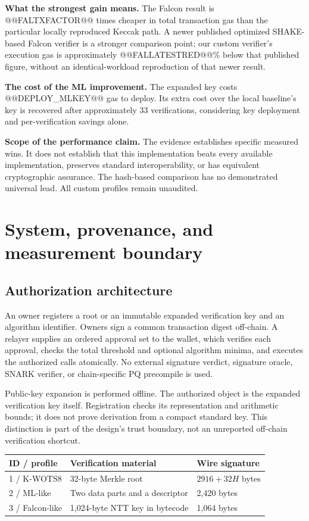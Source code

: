 \documentclass[11pt,a4paper]{article}
\newcommand{\callout}[1]{\par\smallskip\noindent\colorbox{pale}{\parbox{\dimexpr\linewidth-2\fboxsep\relax}{\small #1}}\par\smallskip}
\begin{document}
\textbf{What the strongest gain means.} The Falcon result is
@@FALTXFACTOR@@ times cheaper in total transaction gas than the particular
locally reproduced Keccak path. A newer published optimized SHAKE-based Falcon
verifier is a stronger comparison point; our custom verifier's execution gas
is approximately @@FALLATESTRED@@\% below that published figure, without an
identical-workload reproduction of that newer result.

\textbf{The cost of the ML improvement.} The expanded key costs
@@DEPLOY_MLKEY@@ gas to deploy. Its extra cost over the local baseline's key
is recovered after approximately 33 verifications, considering key deployment
and per-verification savings alone.

\callout{\textbf{Scope of the performance claim.} The evidence establishes
specific measured wins. It does not establish that this implementation beats
every available implementation, preserves standard interoperability, or has
equivalent cryptographic assurance. The hash-based comparison has no
demonstrated universal lead. All custom profiles remain unaudited.}

\newpage
\section{System, provenance, and measurement boundary}
\subsection{Authorization architecture}
An owner registers a root or an immutable expanded verification key and an
algorithm identifier. Owners sign a common transaction digest off-chain. A
relayer supplies an ordered approval set to the wallet, which verifies each
approval, checks the total threshold and optional algorithm minima, and
executes the authorized calls atomically. No external signature verdict,
signature oracle, SNARK verifier, or chain-specific PQ precompile is used.

Public-key expansion is performed offline. The authorized object is the
expanded verification key itself. Registration checks its representation and
arithmetic bounds; it does not prove derivation from a compact standard key.
This distinction is part of the design's trust boundary, not an unreported
off-chain verification shortcut.

\begin{tabularx}{\linewidth}{lYY}
\toprule
\textbf{ID / profile} & \textbf{Verification material} & \textbf{Wire signature}\\
 / K-WOTS8 & 32-byte Merkle root & $2916+32H$ bytes\\
2 / ML-like & Two data parts and a descriptor & 2,420 bytes\\
3 / Falcon-like & 1,024-byte NTT key in bytecode & 1,064 bytes\\
\bottomrule
\end{tabularx}
\end{document}

